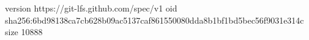 version https://git-lfs.github.com/spec/v1
oid sha256:6bd98138ca7cb628b09ac5137caf861550080dda8b1bf1bd5bec56f9031e314c
size 10888
